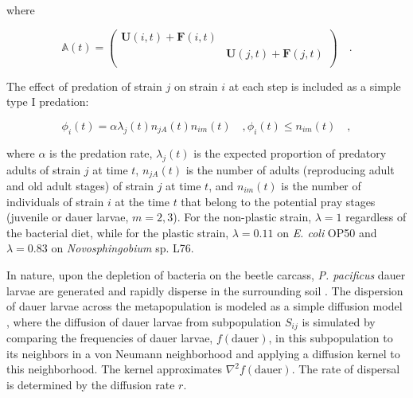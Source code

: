 \documentclass[10pt,letterpaper]{article}
\newcommand{\ecoli}{\emph{E. coli} OP50}
\newcommand{\novo}{\emph{Novosphingobium} sp. L76}
\newcommand{\ppac}{\emph{P. pacificus}}
\begin{document}
where

\begin{equation}
\mathbb{A}(t) = 
\begin{pmatrix}
\mathbf{U}(i,t) + \mathbf{F}(i,t) &  \\
& \mathbf{U}(j,t) + \mathbf{F}(j,t)\\
\end{pmatrix} \quad .
\end{equation}

\hspace{5cm}

The effect of predation of strain $j$ on strain $i$ at each step is included as a simple type I predation:

\begin{equation}
    \phi_{i}(t) = \alpha \lambda_j(t) n_{jA}(t) n_{im}(t) \quad , \phi_{i}(t) \leqslant  n_{im}(t)  \quad ,
\label{eq:pred}
\end{equation}

where $\alpha$ is the predation rate, $\lambda_j(t)$ is the expected proportion of predatory adults of strain $j$ at time $t$, $n_{jA}(t)$ is the number of adults (reproducing adult and old adult stages) of strain $j$ at time $t$, and $n_{im}(t)$ is the number of individuals of strain $i$ at the time $t$ that belong to the potential pray stages (juvenile or dauer larvae, $m=2,3$). For the non-plastic strain, $\lambda=1$ regardless of the bacterial diet, while for the plastic strain, $\lambda=0.11$ on \ecoli{} and $\lambda=0.83$ on \novo{}. 


\hspace{5cm}

In nature, upon the depletion of bacteria on the beetle carcass, \ppac{} dauer larvae are generated and rapidly disperse in the surrounding soil \cite{Renahan2021aa}. The dispersion of dauer larvae across the metapopulation is modeled as a simple diffusion model \cite{Downey2018}, where the diffusion of dauer larvae from subpopulation $S_{ij}$ is simulated by comparing the frequencies of dauer larvae, $f(\mathrm{dauer})$, in this subpopulation to its neighbors in a von Neumann neighborhood and applying a diffusion kernel to this neighborhood. The kernel approximates $\nabla^2 f(\mathrm{dauer})$. The rate of dispersal is determined by the diffusion rate $r$.

\hspace{5cm}
\end{document}

